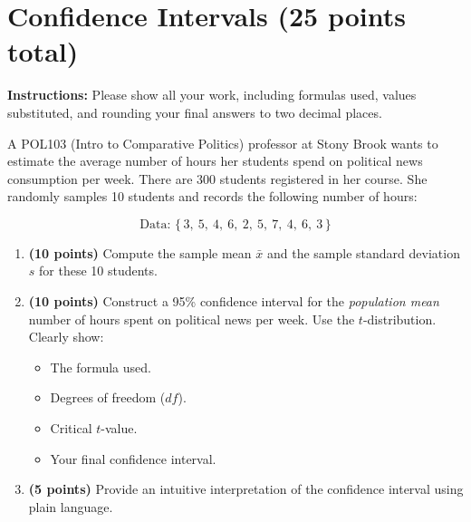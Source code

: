 \documentclass{article}
\newcommand{\blankbox}[2][3cm]{%
    \vspace{-0.5em}
    \begin{figure}[H]
        \makebox[\linewidth]{%
            \begin{tcolorbox}[
                colback=white, 
                colframe=white,  %
                width=#2, %
                height=#1,
                boxrule=0.2mm
            ]
            \end{tcolorbox}
        }
    \end{figure}
    \vspace{-2em}
}
\begin{document}
\newpage

\section{Confidence Intervals (25 points total)}
\noindent\textbf{Instructions:} Please show all your work, including formulas used, values substituted, and rounding your final answers to two decimal places.

\bigskip
\noindent A POL103 (Intro to Comparative Politics) professor at Stony Brook wants to estimate the average number of hours her students spend on political news consumption per week. There are 300 students registered in her course. She randomly samples 10 students and records the following number of hours:

\[
\text{Data: } \{\, 3,\ 5,\ 4,\ 6,\ 2,\ 5,\ 7,\ 4,\ 6,\ 3 \,\}
\]

\begin{enumerate}
    \item \textbf{(10 points)}  Compute the sample mean $\bar{x}$ and the sample standard deviation $s$ for these 10 students. \blankbox[3cm]{1.0\linewidth}
    
    \item \textbf{(10 points)}   Construct a 95\% confidence interval for the \emph{population mean} number of hours spent on political news per week. Use the $t$-distribution. Clearly show:
    \begin{itemize}
        \item The formula used.
        \item Degrees of freedom ($df$).
        \item Critical $t$-value.
        \item Your final confidence interval.
    \end{itemize}
    \blankbox[8.5cm]{1.0\linewidth}

    \item \textbf{(5 points)}   Provide an intuitive interpretation of the confidence interval using plain language. 
\end{enumerate}


\end{document}
